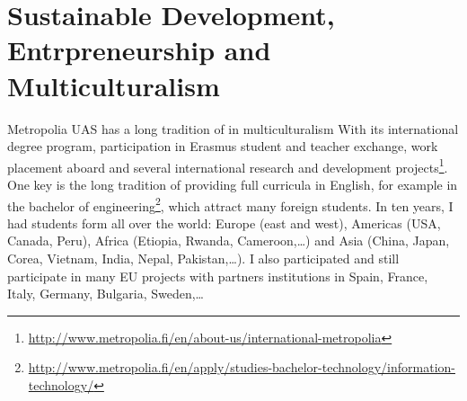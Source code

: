 \section{Sustainable Development, Entrpreneurship and Multiculturalism}

Metropolia UAS has a long tradition of in multiculturalism With its international degree program, participation in Erasmus student and teacher exchange, work placement aboard and several international research and development projects\footnote{\url{http://www.metropolia.fi/en/about-us/international-metropolia}}. 
One key is the long tradition of providing full curricula in English, for example in the bachelor of engineering\footnote{\url{http://www.metropolia.fi/en/apply/studies-bachelor-technology/information-technology/}}, which attract many foreign students.
In ten years, I had students form all over the world: Europe (east and west), Americas (USA, Canada, Peru), Africa (Etiopia, Rwanda, Cameroon,\ldots) and Asia (China, Japan, Corea, Vietnam, India, Nepal, Pakistan,\ldots).
I also participated and still participate in many EU projects with partners institutions in Spain, France, Italy, Germany, Bulgaria, Sweden,\ldots

  